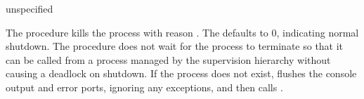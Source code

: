\begin{procedure}
\end{procedure}
\returns{} unspecified

The  procedure kills the
 process with reason . The
 defaults to 0, indicating normal shutdown. The
procedure does not wait for the  process to
terminate so that it can be called from a process managed by the
supervision hierarchy without causing a deadlock on shutdown. If the
 process does not exist, 
flushes the console output and error ports, ignoring any exceptions,
and then calls .
